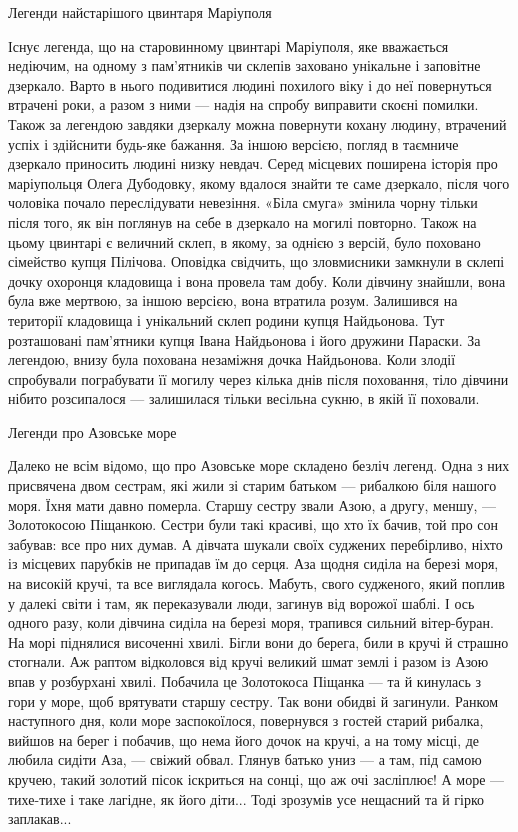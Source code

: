 Легенди найстарішого цвинтаря Маріуполя

Існує легенда, що на старовинному цвинтарі Маріуполя, яке вважається недіючим,
на одному з пам'ятників чи склепів заховано унікальне і заповітне дзеркало.
Варто в нього подивитися людині похилого віку і до неї повернуться втрачені
роки, а разом з ними — надія на спробу виправити скоєні помилки. Також за
легендою завдяки дзеркалу можна повернути кохану людину, втрачений успіх і
здійснити будь-яке бажання. За іншою версією, погляд в таємниче дзеркало
приносить людині низку невдач. Серед місцевих поширена історія про маріупольця
Олега Дубодовку, якому вдалося знайти те саме дзеркало, після чого чоловіка
почало переслідувати невезіння. «Біла смуга» змінила чорну тільки після того,
як він поглянув на себе в дзеркало на могилі повторно. Також на цьому цвинтарі
є величний склеп, в якому, за однією з версій, було поховано сімейство купця
Пілічова. Оповідка свідчить, що зловмисники замкнули в склепі дочку охоронця
кладовища і вона провела там добу. Коли дівчину знайшли, вона була вже мертвою,
за іншою версією, вона втратила розум. Залишився на території кладовища і
унікальний склеп родини купця Найдьонова. Тут розташовані пам'ятники купця
Івана Найдьонова і його дружини Параски. За легендою, внизу була похована
незаміжня дочка Найдьонова. Коли злодії спробували пограбувати її могилу через
кілька днів після поховання, тіло дівчини нібито розсипалося — залишилася
тільки весільна сукню, в якій її поховали.

Легенди про Азовське море 

Далеко не всім відомо, що про Азовське море складено безліч легенд. Одна з них
присвячена двом сестрам, які жили зі старим батьком — рибалкою біля нашого
моря. Їхня мати давно померла. Старшу сестру звали Азою, а другу, меншу, —
Золотокосою Піщанкою. Сестри були такі красиві, що хто їх бачив, той про сон
забував: все про них думав. А дівчата шукали своїх суджених перебірливо, ніхто
із місцевих парубків не припадав їм до серця. Аза щодня сиділа на березі моря,
на високій кручі, та все виглядала когось. Мабуть, свого судженого, який поплив
у далекі світи і там, як переказували люди, загинув від ворожої шаблі. І ось
одного разу, коли дівчина сиділа на березі моря, трапився сильний вітер-буран.
На морі піднялися височенні хвилі. Бігли вони до берега, били в кручі й страшно
стогнали. Аж раптом відколовся від кручі великий шмат землі і разом із Азою
впав у розбурхані хвилі. Побачила це Золотокоса Піщанка — та й кинулась з гори
у море, щоб врятувати старшу сестру. Так вони обидві й загинули. Ранком
наступного дня, коли море заспокоїлося, повернувся з гостей старий рибалка,
вийшов на берег і побачив, що нема його дочок на кручі, а на тому місці, де
любила сидіти Аза, — свіжий обвал. Глянув батько униз — а там, під самою
кручею, такий золотий пісок іскриться на сонці, що аж очі засліплює! А море —
тихе-тихе і таке лагідне, як його діти... Тоді зрозумів усе нещасний та й гірко
заплакав...

